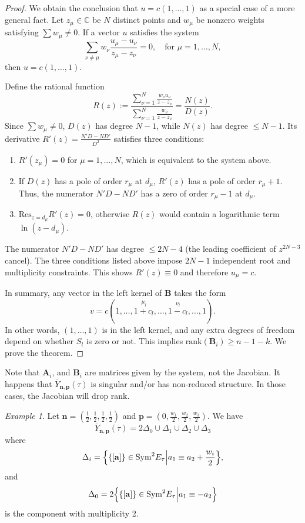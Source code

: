 \documentclass[11pt]{amsart}
\theoremstyle{remark}
\newtheorem{example}[theorem]{Example}
\numberwithin{equation}{section}
\newcommand{\Sym}{{\rm Sym}}
\begin{document}
\begin{proof}
We obtain the conclusion that $u = c(1,\dots,1)$ as a special case of a more general fact. Let $z_\mu \in \mathbb{C}$ be $N$ distinct points and $w_\mu$ be nonzero weights satisfying $\sum w_\mu \neq 0$. If a vector $u$ satisfies the system
\[    \sum_{\nu \neq \mu} w_\nu \frac{u_\mu - u_\nu}{z_\mu - z_\nu} = 0, \quad \text{for } \mu=1,\dots,N,
\]
then $u = c(1,\dots,1)$.

Define the rational function
\[
    R(z) := \frac{ \sum_{\nu=1}^{N} \frac{w_\nu u_\nu}{z-z_\nu} }{ \sum_{\nu=1}^N \frac{w_\nu}{z-z_\nu} } = \frac{N(z)}{D(z)}.
\]
Since $\sum w_\mu \neq 0$, $D(z)$ has degree $N-1$, while $N(z)$ has degree $\leq N-1$. Its derivative $R'(z) = \frac{N'D - ND'}{D^2}$ satisfies three conditions:
\begin{enumerate}
    \item $R'(z_\mu) = 0$ for $\mu=1,\dots,N$, which is equivalent to the system above.
    \item If $D(z)$ has a pole of order $r_\mu$ at $d_\mu$, $R'(z)$ has a pole of order $r_\mu+1$. Thus, the numerator $N'D - ND'$ has a zero of order $r_\mu - 1$ at $d_\mu$.
    \item $\mathrm{Res}_{z=d_\mu} R'(z) = 0$, otherwise $R(z)$ would contain a logarithmic term $\ln(z-d_\mu)$.
\end{enumerate}
The numerator $N'D - ND'$ has degree $\leq 2N-4$ (the leading coefficient of $z^{2N-3}$ cancel). The three conditions listed above impose $2N-1$ independent root and multiplicity constraints. This shows $R'(z) \equiv 0$ and therefore $u_\mu = c$.

In summary, any vector in the left kernel of $\mathbf{B}$ takes the form
\[
    v = c(1, \dots, \overset{\mu_l}{1+c_l}, \dots, \overset{\nu_l}{1-c_l}, \dots, 1).
\]
In other words, $(1,\dots,1)$ is in the left kernel, and any extra degrees of freedom depend on whether $S_l$ is zero or not. This implies $\mathrm{rank}(\mathbf{B}_i) \geq n-1-k$. We prove the theorem.
\end{proof}

Note that $\mathbf{A}_i$, and $\mathbf{B}_i$ are matrices given by the system, not the Jacobian. It happens that $\overline{Y}_{\mathbf{n},\mathbf{p}}(\tau)$ is singular and/or has non-reduced structure. In those cases, the Jacobian will drop rank.
\begin{example} \label{eg:GLC_half_periods}
Let $\mathbf{n} = (\frac{1}{2}, \frac{1}{2}, \frac{1}{2}, \frac{1}{2})$ and $\mathbf{p} = (0, \frac{w_1}{2}, \frac{w_2}{2}, \frac{w_3}{2} )$. We have
\[
    \overline{Y}_{\mathbf{n}, \mathbf{p}}(\tau) = 2\Delta_0 \cup \Delta_1 \cup \Delta_2 \cup \Delta_3
\]
where
\[
    \Delta_i = \Big\{ \{[\mathbf{a}] \} \in \Sym^2 E_{\tau} \Big| a_1 \equiv a_2 + \frac{w_i}{2} \Big\},
\]
and
\[
    \Delta_0 = 2 \Big\{ \{[\mathbf{a}] \}\in \Sym^2 E_{\tau} \Big| a_1 \equiv -a_2 \Big\}
\]
is the component with multiplicity 2. 
\end{example}
\end{document}
